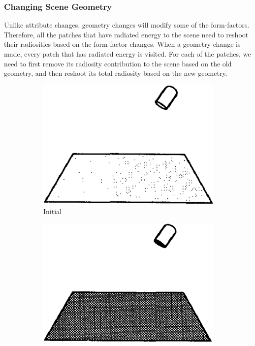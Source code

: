 \subsubsection{Changing Scene Geometry}
Unlike attribute changes, geometry changes will modify some of the form-factors. Therefore, all the patches that have radiated energy to the scene need to reshoot their radiosities based on the form-factor changes. When a geometry change is made, every patch that has radiated energy is visited. For each of the patches, we need to first remove its radiosity contribution to the scene based on the old geometry, and then reshoot its total radiosity based on the new geometry.


\begin{figure}
	\begin{subfigure}[b]{0.243\textwidth}
		\includegraphics{graphics/gi/path-36-1}
		\caption{Initial}
	\end{subfigure}
	\begin{subfigure}[b]{0.243\textwidth}
		\includegraphics{graphics/gi/path-36-2}

\end{subfigure}
\end{figure}
